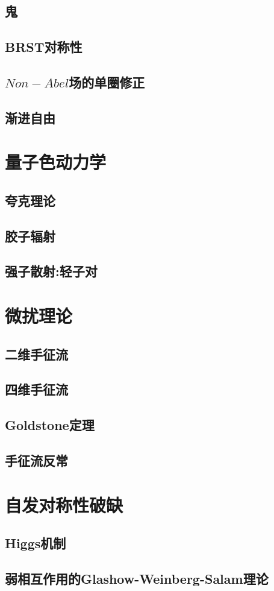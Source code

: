 \documentclass[a4paper,11pt]{article}
\theoremstyle{mystyle}
\begin{document}
\subsection{鬼}
\subsection{BRST对称性}
\subsection{$Non-Abel$场的单圈修正}
\subsection{渐进自由}
\section{量子色动力学}
\subsection{夸克理论}
\subsection{胶子辐射}
\subsection{强子散射:轻子对}
\section{微扰理论}
\subsection{二维手征流}
\subsection{四维手征流}
\subsection{Goldstone定理}
\subsection{手征流反常}
\section{自发对称性破缺}
\subsection{Higgs机制}
\subsection{弱相互作用的Glashow-Weinberg-Salam理论}
\end{document}
